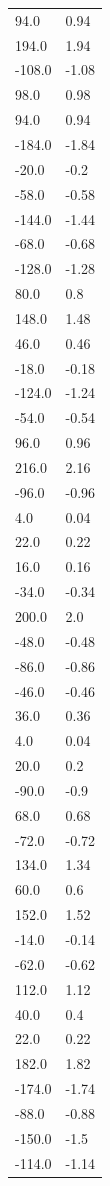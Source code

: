 \begin{longtable}{ll}
94.0 & 0.94 \\
194.0 & 1.94 \\
-108.0 & -1.08 \\
98.0 & 0.98 \\
94.0 & 0.94 \\
-184.0 & -1.84 \\
-20.0 & -0.2 \\
-58.0 & -0.58 \\
-144.0 & -1.44 \\
-68.0 & -0.68 \\
-128.0 & -1.28 \\
80.0 & 0.8 \\
148.0 & 1.48 \\
46.0 & 0.46 \\
-18.0 & -0.18 \\
-124.0 & -1.24 \\
-54.0 & -0.54 \\
96.0 & 0.96 \\
216.0 & 2.16 \\
-96.0 & -0.96 \\
4.0 & 0.04 \\
22.0 & 0.22 \\
16.0 & 0.16 \\
-34.0 & -0.34 \\
200.0 & 2.0 \\
-48.0 & -0.48 \\
-86.0 & -0.86 \\
-46.0 & -0.46 \\
36.0 & 0.36 \\
4.0 & 0.04 \\
20.0 & 0.2 \\
-90.0 & -0.9 \\
68.0 & 0.68 \\
-72.0 & -0.72 \\
134.0 & 1.34 \\
60.0 & 0.6 \\
152.0 & 1.52 \\
-14.0 & -0.14 \\
-62.0 & -0.62 \\
112.0 & 1.12 \\
40.0 & 0.4 \\
22.0 & 0.22 \\
182.0 & 1.82 \\
-174.0 & -1.74 \\
-88.0 & -0.88 \\
-150.0 & -1.5 \\
-114.0 & -1.14 \\

\end{longtable}
